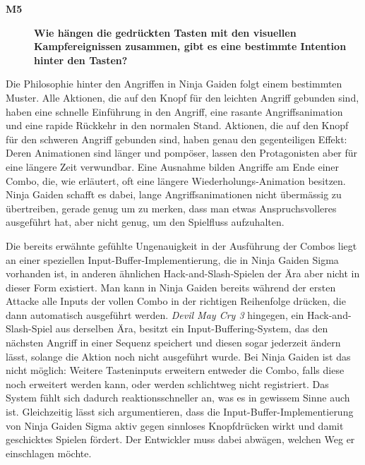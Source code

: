 \documentclass[../Main.tex]{subfiles}
\begin{document}
\begin{description}
  \item[\textbf{M5}] \textbf{Wie hängen die gedrückten Tasten mit den visuellen Kampfereignissen zusammen, gibt es eine bestimmte Intention hinter den Tasten?}
\end{description}

Die Philosophie hinter den Angriffen in Ninja Gaiden folgt einem bestimmten Muster. Alle Aktionen, die auf den Knopf für den leichten Angriff gebunden sind, haben eine schnelle Einführung in den Angriff, eine rasante Angriffsanimation und eine rapide Rückkehr in den normalen Stand. Aktionen, die auf den Knopf für den schweren Angriff gebunden sind, haben genau den gegenteiligen Effekt: Deren Animationen sind länger und pompöser, lassen den Protagonisten aber für eine längere Zeit verwundbar. Eine Ausnahme bilden Angriffe am Ende einer Combo, die, wie erläutert, oft eine längere Wiederholungs-Animation besitzen. Ninja Gaiden schafft es dabei, lange Angriffsanimationen nicht übermässig zu übertreiben, gerade genug um zu merken, dass man etwas Anspruchsvolleres ausgeführt hat, aber nicht genug, um den Spielfluss aufzuhalten.

Die bereits erwähnte gefühlte Ungenauigkeit in der Ausführung der Combos liegt an einer speziellen Input-Buffer-Implementierung, die in Ninja Gaiden Sigma vorhanden ist, in anderen ähnlichen Hack-and-Slash-Spielen der Ära aber nicht in dieser Form existiert. Man kann in Ninja Gaiden bereits während der ersten Attacke alle Inputs der vollen Combo in der richtigen Reihenfolge drücken, die dann automatisch ausgeführt werden. \textit{Devil May Cry 3} hingegen, ein Hack-and-Slash-Spiel aus derselben Ära, besitzt ein Input-Buffering-System, das den nächsten Angriff in einer Sequenz speichert und diesen sogar jederzeit ändern lässt, solange die Aktion noch nicht ausgeführt wurde.\autocite{dmcwiki_inputbuffering} Bei Ninja Gaiden ist das nicht möglich: Weitere Tasteninputs erweitern entweder die Combo, falls diese noch erweitert werden kann, oder werden schlichtweg nicht registriert. Das System fühlt sich dadurch reaktionsschneller an, was es in gewissem Sinne auch ist. Gleichzeitig lässt sich argumentieren, dass die Input-Buffer-Implementierung von Ninja Gaiden Sigma aktiv gegen sinnloses Knopfdrücken wirkt und damit geschicktes Spielen fördert. Der Entwickler muss dabei abwägen, welchen Weg er einschlagen möchte.
\end{document}
